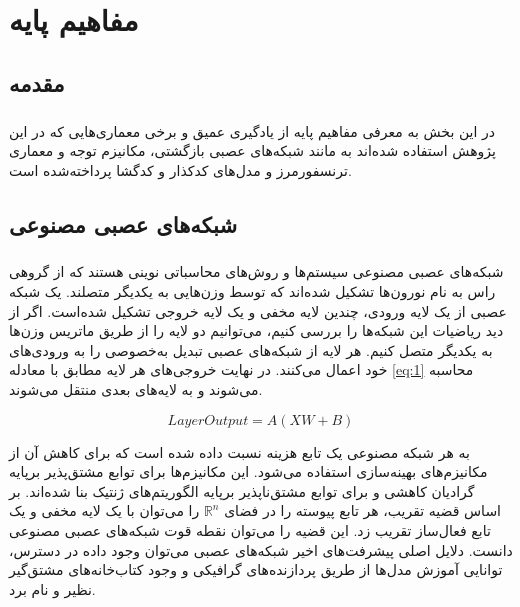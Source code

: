 
\chapter{مفاهیم پایه} \label{ch:basics}
\thispagestyle{empty}


\section{مقدمه}
\paragraph{}
{
    در این بخش به معرفی مفاهیم پایه از یادگیری عمیق و برخی معماری‌هایی که 
    در این پژوهش استفاده شده‌اند به مانند شبکه‌های عصبی بازگشتی، مکانیزم‌ توجه و معماری
    ترنسفورمرز و مدل‌های کدکذار و کدگشا پرداخته‌شده است.
}


\section{شبکه‌های عصبی مصنوعی}
\label{sec:ann}
\paragraph{}
{
    شبکه‌های عصبی مصنوعی سیستم‌ها و روش‌های محاسباتی نوینی هستند که 
    از گروهی راس‌ به نام نورون‌ها تشکیل شده‌اند که توسط وزن‌هایی به
    یکدیگر متصلند. یک شبکه عصبی از یک لایه ورودی، چندین لایه مخفی و یک لایه
    خروجی تشکیل شده‌است. اگر از دید ریاضیات این شبکه‌ها را بررسی کنیم، می‌توانیم 
    دو لایه را از طریق ماتریس وزن‌ها به یکدیگر متصل کنیم. هر لایه از شبکه‌های عصبی 
    تبدیل به‌خصوصی را به ورودی‌های خود اعمال می‌کنند. در نهایت خروجی‌های هر لایه 
    مطابق با معادله
    \ref{eq:1}
    محاسبه می‌شوند و به لایه‌های بعدی منتقل می‌شوند. 
    \begin{center}
        \begin{equation} \label{eq:1}
            LayerOutput = A(XW + B)
        \end{equation}
    \end{center}

    به هر شبکه مصنوعی یک تابع هزینه نسبت داده‌ شده است که برای کاهش آن
    از مکانیزم‌های بهینه‌سازی استفاده‌ می‌شود. این مکانیزم‌ها برای توابع
    مشتق‌پذیر برپایه گرادیان کاهشی و برای توابع مشتق‌ناپذیر برپایه الگوریتم‌های 
    ژنتیک بنا شده‌اند. بر اساس قضیه تقریب، هر تابع پیوسته را در فضای 
    $\mathbb{R}^n$
    را می‌توان با یک لایه مخفی و یک تابع فعال‌ساز تقریب زد. این قضیه را می‌توان نقطه 
    قوت شبکه‌های عصبی مصنوعی دانست. دلایل اصلی پیشرفت‌های اخیر شبکه‌های عصبی می‌توان
    وجود داده در دسترس، توانایی آموزش مدل‌ها از طریق پردازنده‌های گرافیکی 
    و وجود کتاب‌خانه‌های مشتق‌گیر نظیر 
    \cite{tensorflow2015-whitepaper}
    و 
    \cite{NEURIPS2019_9015}
    نام برد. 
}


